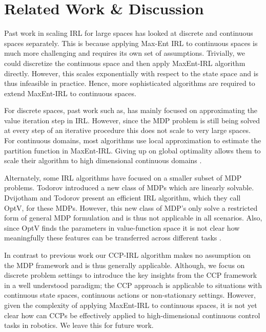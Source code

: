 \documentclass{article}
\begin{document}


\section{Related Work \& Discussion}

Past work in scaling IRL for large spaces has looked at discrete and continuous spaces separately. This is because applying Max-Ent IRL to continuous spaces is much more challenging and requires its own set of assumptions. Trivially, we could discretize the continuous space and then apply MaxEnt-IRL algorithm directly. However, this scales exponentially with respect to the state space and is thus infeasible in practice. Hence, more sophisticated algorithms are required to extend MaxEnt-IRL to continuous spaces. 

For discrete spaces, past work such as, \cite{huang2015approximate} has mainly focused on approximating the value iteration step in IRL. However, since the MDP problem is still being solved at every step of an iterative procedure this does not scale to very large spaces. For continuous domains, most algorithms use local approximation to estimate the partition function in MaxEnt-IRL. Giving up on global optimality allows them to scale their algorithm to high dimensional continuous domains \cite{levine2012continuous, kalakrishnan2013learning, finn2016guided}.

Alternately, some IRL algorithms have focused on a smaller subset of MDP problems. Todorov  introduced a new class of MDPs which are linearly solvable. Dvijotham and Todorov  present an efficient IRL algorithm, which they call OptV, for these MDPs. However, this new class of MDP's only solve a restricted form of general MDP formulation and is thus not applicable in all scenarios. 
Also, since OptV finds the parameters in value-function space it is not clear how meaningfully these features can be transferred across different tasks \cite{levine2012continuous}.


In contrast to previous work our CCP-IRL algorithm makes no assumption on the MDP framework and is thus generally applicable. 
Although, we focus on discrete problem settings to introduce the key insights from the CCP framework in a well understood paradigm; the CCP approach is applicable to situations with continuous state spaces, continuous actions or non-stationary settings. However, given the complexity of applying MaxEnt-IRL to continuous spaces, it is not yet clear how can CCPs be effectively applied to high-dimensional continuous control tasks in robotics. We leave this for future work.
\end{document}
